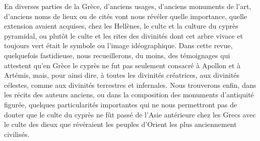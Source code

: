 \documentclass{article}
\begin{document}
En diverses parties de la Grèce, d'anciens usages, d'anciens monuments de l'art, d'anciens noms de lieux ou de cités vont nous révéler quelle importance, quelle extension avaient acquises, chez les Hellènes, le culte et la culture du cyprès pyramidal, ou plutôt le culte et les rites des divinités dont cet arbre vivace et toujours vert était le symbole ou l'image idéographique. Dans cette revue, quelquefois fastidieuse, nous recueillerons, du moins, des témoignages qui attestent qu'en Grèce le cyprès ne fut pas seulement consacré à Apollon et à Artémis, mais, pour ainsi dire, à toutes les divinités créatrices, aux divinités célestes, comme aux divinités terrestres et infernales. Nous trouverons enfin, dans les récits des auteurs anciens, ou dans la composition des monuments d'antiquité figurée, quelques particularités importantes qui ne nous permettront pas de douter que le culte du cyprès ne fût passé de l'Asie antérieure chez les Grecs avec le culte des dieux que révéraient les peuples d'Orient les plus anciennement civilisés.
\end{document}
